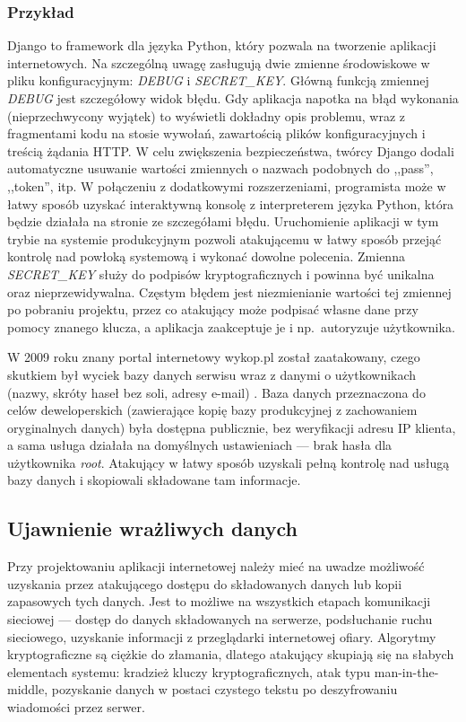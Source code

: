 \documentclass[11pt,a4paper,polish,thesis]{dcsbook}
\begin{document}
\subsubsection*{Przykład}
Django \cite{django} to framework dla języka Python, który pozwala na tworzenie aplikacji internetowych. Na szczególną uwagę zasługują dwie zmienne środowiskowe w pliku konfiguracyjnym: \textit{DEBUG} i \textit{SECRET\_KEY}. Główną funkcją zmiennej \textit{DEBUG} jest szczegółowy widok błędu. Gdy aplikacja napotka na błąd wykonania (nieprzechwycony wyjątek) to wyświetli dokładny opis problemu, wraz z fragmentami kodu na stosie wywołań, zawartością plików konfiguracyjnych i treścią żądania HTTP. W celu zwiększenia bezpieczeństwa, twórcy Django dodali automatyczne usuwanie wartości zmiennych o nazwach podobnych do ,,pass'', ,,token'', itp. W połączeniu z dodatkowymi rozszerzeniami, programista może w łatwy sposób uzyskać interaktywną konsolę z interpreterem języka Python, która będzie działała na stronie ze szczegółami błędu. Uruchomienie aplikacji w tym trybie na systemie produkcyjnym pozwoli atakującemu w łatwy sposób przejąć kontrolę nad powłoką systemową i wykonać dowolne polecenia. Zmienna \textit{SECRET\_KEY} służy do podpisów kryptograficznych i powinna być unikalna oraz nieprzewidywalna. Częstym błędem jest niezmienianie wartości tej zmiennej po pobraniu projektu, przez co atakujący może podpisać własne dane przy pomocy znanego klucza, a aplikacja zaakceptuje je i np.~autoryzuje użytkownika.

W 2009 roku znany portal internetowy wykop.pl został zaatakowany, czego skutkiem był wyciek bazy danych serwisu wraz z danymi o użytkownikach (nazwy, skróty haseł bez soli, adresy e-mail) \cite{wykop}. Baza danych przeznaczona do celów deweloperskich (zawierające kopię bazy produkcyjnej z zachowaniem oryginalnych danych) była dostępna publicznie, bez weryfikacji adresu IP klienta, a sama usługa działała na domyślnych ustawieniach --- brak hasła dla użytkownika \textit{root}. Atakujący w łatwy sposób uzyskali pełną kontrolę nad usługą bazy danych i skopiowali składowane tam informacje.

\subsection{Ujawnienie wrażliwych danych}
Przy projektowaniu aplikacji internetowej należy mieć na uwadze możliwość uzyskania przez atakującego dostępu do składowanych danych lub kopii zapasowych tych danych. Jest to możliwe na wszystkich etapach komunikacji sieciowej --- dostęp do danych składowanych na serwerze, podsłuchanie ruchu sieciowego, uzyskanie informacji z przeglądarki internetowej ofiary. Algorytmy kryptograficzne są ciężkie do złamania, dlatego atakujący skupiają się na słabych elementach systemu: kradzież kluczy kryptograficznych, atak typu man-in-the-middle, pozyskanie danych w postaci czystego tekstu po deszyfrowaniu wiadomości przez serwer.
\end{document}
